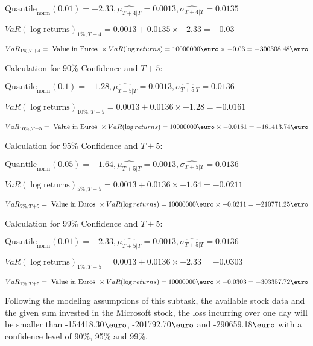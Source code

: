 \indent\indent $\text{Quantile}_\text{norm}(0.01) = -2.33,\hat{\mu_{T+4|T}} = 0.0013, \hat{\sigma_{T+4|T}} = 0.0135$

\indent\indent $VaR(\log \text{returns})_{1\%, T + 4} = 0.0013 + 0.0135\times-2.33 = -0.03$

\indent\indent $VaR_{1\%, T + 4} = \text{ Value in Euros } \times VaR(\log returns) = 10 000 000 \text{\euro} \times-0.03 = -300308.48 \text{\euro}$\newline




Calculation for 90\% Confidence and $T+5$:

\indent\indent $\text{Quantile}_\text{norm}(0.1) = -1.28,\hat{\mu_{T+5|T}} = 0.0013, \hat{\sigma_{T+5|T}} = 0.0136$

\indent\indent $VaR(\log \text{returns})_{10\%, T + 5} = 0.0013 + 0.0136\times-1.28 = -0.0161$

\indent\indent $VaR_{10\%, T + 5} = \text{ Value in Euros } \times VaR(\log returns) = 10 000 000 \text{\euro} \times-0.0161 = -161413.74 \text{\euro}$\newline




Calculation for 95\% Confidence and $T+5$:

\indent\indent $\text{Quantile}_\text{norm}(0.05) = -1.64,\hat{\mu_{T+5|T}} = 0.0013, \hat{\sigma_{T+5|T}} = 0.0136$

\indent\indent $VaR(\log \text{returns})_{5\%, T + 5} = 0.0013 + 0.0136\times-1.64 = -0.0211$

\indent\indent $VaR_{5\%, T + 5} = \text{ Value in Euros } \times VaR(\log returns) = 10 000 000 \text{\euro} \times-0.0211 = -210771.25 \text{\euro}$\newline




Calculation for 99\% Confidence and $T+5$:

\indent\indent $\text{Quantile}_\text{norm}(0.01) = -2.33,\hat{\mu_{T+5|T}} = 0.0013, \hat{\sigma_{T+5|T}} = 0.0136$

\indent\indent $VaR(\log \text{returns})_{1\%, T + 5} = 0.0013 + 0.0136\times-2.33 = -0.0303$

\indent\indent $VaR_{1\%, T + 5} = \text{ Value in Euros } \times VaR(\log returns) = 10 000 000 \text{\euro} \times-0.0303 = -303357.72 \text{\euro}$\newline


Following the modeling assumptions of this subtask, the available stock data and the given sum invested in the Microsoft stock, the loss incurring over one day will be smaller than -154418.30$\text{\euro}$, -201792.70$\text{\euro}$  and -290659.18$\text{\euro}$  with a confidence level of 90\%, 95\%  and 99\%.

